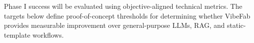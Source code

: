 

Phase I success will be evaluated using objective-aligned technical metrics. The targets below define proof-of-concept thresholds for determining whether VibeFab provides measurable improvement over general-purpose LLMs, RAG, and static-template workflows.

